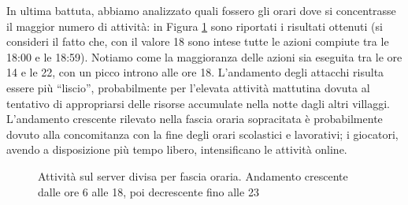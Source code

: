 In ultima battuta, abbiamo analizzato quali fossero gli orari dove si concentrasse il maggior numero di attività: in Figura \ref{fig:activity_layers} sono riportati i risultati ottenuti (si consideri il fatto che, con il valore 18 sono intese tutte le azioni compiute tra le 18:00 e le 18:59). Notiamo come la maggioranza delle azioni sia eseguita tra le ore 14 e le 22, con un picco introno alle ore 18. L'andamento degli attacchi risulta essere più “liscio”, probabilmente per l'elevata attività mattutina dovuta al tentativo di appropriarsi delle risorse accumulate nella notte dagli altri villaggi. L'andamento crescente rilevato nella fascia oraria sopracitata è probabilmente dovuto alla concomitanza con la fine degli orari scolastici e lavorativi; i giocatori, avendo a disposizione più tempo libero, intensificano le attività online.\\
\begin{figure}
	\hfill
	\caption{Attività sul server divisa per fascia oraria. Andamento crescente dalle ore 6 alle 18, poi decrescente fino alle 23}
	\label{fig:activity_layers}
\end{figure}


